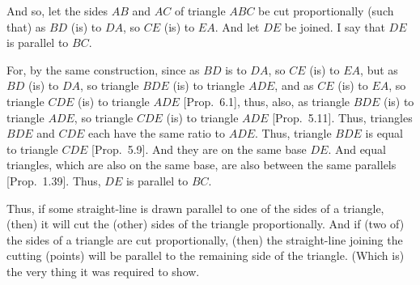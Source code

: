 \begin{Parallel}{}{}
{And so, let the sides $AB$ and $AC$ of triangle $ABC$ be cut proportionally (such that)
as $BD$ (is) to $DA$, so $CE$ (is) to $EA$. And let $DE$ be joined. I say that
$DE$ is parallel to $BC$.

For, by the same construction, since as $BD$ is to $DA$, so $CE$ (is) to $EA$, but
as $BD$ (is) to $DA$, so triangle $BDE$ (is) to triangle $ADE$, and as $CE$
(is) to $EA$, so triangle $CDE$ (is) to triangle $ADE$ [Prop.~6.1], thus, also,  as triangle $BDE$ (is) to triangle
$ADE$, so triangle $CDE$ (is) to triangle $ADE$ [Prop.~5.11]. Thus, triangles $BDE$ and $CDE$ each have the same ratio to $ADE$. Thus, triangle $BDE$ is equal to triangle $CDE$ [Prop.~5.9].
And they are on the same base $DE$. And equal triangles, which are also on the same base, are also between the same parallels  [Prop.~1.39]. Thus,
$DE$ is parallel to $BC$.

Thus, if some straight-line is drawn parallel to one of the
sides of a triangle, (then) it will cut the (other) sides of the triangle
proportionally. And if (two of) the sides of a triangle are cut proportionally, (then)
the straight-line joining the cutting (points) will be parallel to the remaining side of the
triangle. (Which is) the very thing it was required to show.}
\end{Parallel}

